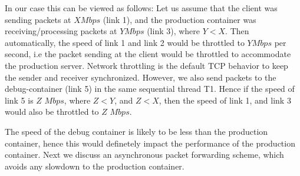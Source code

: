 In our case this can be viewed as follows: Let us assume that the client was sending packets at $X Mbps$ (link 1), and the production container was receiving/processing packets at $Y Mbps$ (link 3), where $Y<X$. 
Then automatically, the speed of link 1 and link 2 would be throttled to $Y Mbps$ per second, i.e the packet sending at the client would be throttled to accommodate the production server. 
Network throttling is the default TCP behavior to keep the sender and receiver synchronized.
However, we also send packets to the debug-container (link 5) in the same sequential thread T1. 
Hence if the speed of link 5 is $Z$ $Mbps$, where $Z < Y$, and $Z < X$, then the speed of link 1, and link 3 would also be throttled to $Z$ $Mbps$.

The speed of the debug container is likely to be less than the production container, hence this would definetely impact the performance of the production container.
Next we discuss an asynchronous packet forwarding scheme, which avoids any slowdown to the production container.


